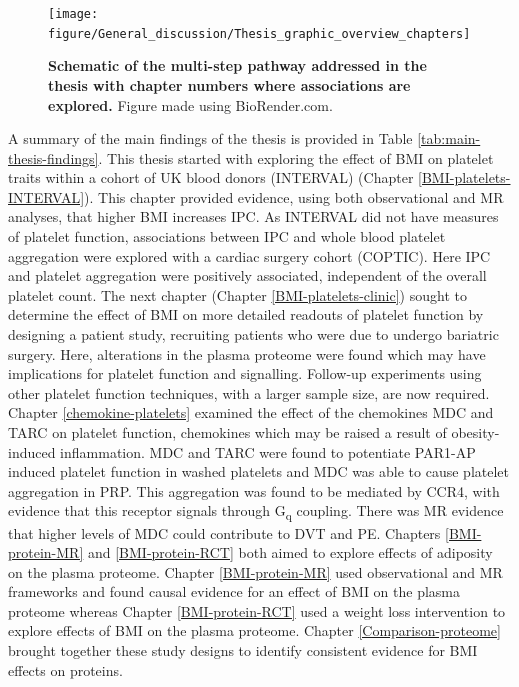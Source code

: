 \documentclass[11pt,twoside]{bristolthesis}
\begin{document}
\begin{figure}
\texttt{[image: figure/General\_discussion/Thesis\_graphic\_overview\_chapters]} \caption[Schematic of the multi-step pathway addressed in the thesis with chapter numbers where associations are explored]{\textbf{Schematic of the multi-step pathway addressed in the thesis with chapter numbers where associations are explored.} Figure made using BioRender.com.}\label{fig:Thesis-schematic-chaps}
\end{figure}
A summary of the main findings of the thesis is provided in Table \ref{tab:main-thesis-findings}. This thesis started with exploring the effect of BMI on platelet traits within a cohort of UK blood donors (INTERVAL) (Chapter \ref{BMI-platelets-INTERVAL}). This chapter provided evidence, using both observational and MR analyses, that higher BMI increases IPC. As INTERVAL did not have measures of platelet function, associations between IPC and whole blood platelet aggregation were explored with a cardiac surgery cohort (COPTIC). Here IPC and platelet aggregation were positively associated, independent of the overall platelet count. The next chapter (Chapter \ref{BMI-platelets-clinic}) sought to determine the effect of BMI on more detailed readouts of platelet function by designing a patient study, recruiting patients who were due to undergo bariatric surgery. Here, alterations in the plasma proteome were found which may have implications for platelet function and signalling. Follow-up experiments using other platelet function techniques, with a larger sample size, are now required. Chapter \ref{chemokine-platelets} examined the effect of the chemokines MDC and TARC on platelet function, chemokines which may be raised a result of obesity-induced inflammation. MDC and TARC were found to potentiate PAR1-AP induced platelet function in washed platelets and MDC was able to cause platelet aggregation in PRP. This aggregation was found to be mediated by CCR4, with evidence that this receptor signals through G\textsubscript{q} coupling. There was MR evidence that higher levels of MDC could contribute to DVT and PE. Chapters \ref{BMI-protein-MR} and \ref{BMI-protein-RCT} both aimed to explore effects of adiposity on the plasma proteome. Chapter \ref{BMI-protein-MR} used observational and MR frameworks and found causal evidence for an effect of BMI on the plasma proteome whereas Chapter \ref{BMI-protein-RCT} used a weight loss intervention to explore effects of BMI on the plasma proteome. Chapter \ref{Comparison-proteome} brought together these study designs to identify consistent evidence for BMI effects on proteins.
\end{document}
